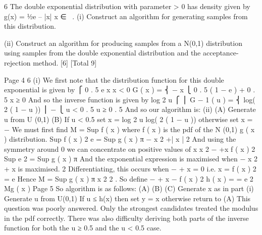 6
The double exponential distribution with parameter \lambda  > 0 has density given by
g(x) = 1⁄2\lambda e – \lambda |x| x ∈ \ .
(i) Construct an algorithm for generating samples from this distribution.

(ii) Construct an algorithm for producing samples from a N(0,1) distribution using
samples from the double exponential distribution and the acceptance-rejection
method.
[6]
[Total 9]



Page 4%
6
(i)
We first note that the distribution function for this double exponential is given
by
⎧
0 . 5 e \lambda  x
x < 0
G ( x ) = ⎨
− \lambda  x
⎩ 0 . 5 ( 1 − e ) + 0 . 5 x ≥ 0
And so the inverse function is given by
log 2 u
⎧
⎪
\lambda 
G − 1 ( u ) = ⎨
log( 2 ( 1 − u ))
⎪ −
\lambda 
⎩
u < 0 . 5
u ≥ 0 . 5
And so our algorithm is:
(ii)
(A) Generate u from U (0,1)
(B) If u < 0.5 set x =
log 2 u
log( 2 ( 1 − u ))
otherwise set x = −
\lambda 
\lambda 
We must first find M = Sup
f ( x )
where f ( x ) is the pdf of the N (0,1)
g ( x )
distribution.
Sup
f ( x )
2
e
= Sup
g ( x )
 π
−
x 2
+\lambda  | x |
2
And using the symmetry around 0 we can concentrate on positive values of x
x 2
− +\lambda  x
f ( x )
2
Sup
e 2
= Sup
g ( x )
 π
And the exponential expression is maximised when −
x 2
+ \lambda  x is maximised.
2
Differentiating, this occurs when − \lambda  + x = 0 i.e. x = \lambda 
f ( x )
2
=
e
Hence M = Sup
g ( x )  π
x 2
2 .
So define
− + \lambda  x −
f ( x )
2
h ( x ) =
= e 2
Mg ( x )
Page 5%
So algorithm is as follows:
(A)
(B)
(C)
Generate x as in part (i)
Generate u from U(0,1)
If u ≤ h(x) then set y = x otherwise return to (A)
This question was poorly answered. Only the strongest candidates treated the
modulus in the pdf correctly. There was also difficulty deriving both parts of the
inverse function for both the u ≥ 0.5 and the u < 0.5 case.
